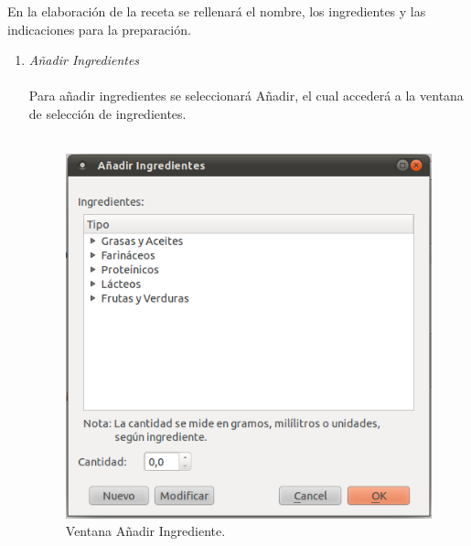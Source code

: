 \begin{enumerate}
En la elaboración de la receta se rellenará el nombre, los ingredientes y las indicaciones para la preparación. 
\begin{enumerate}
\item \textit{Añadir Ingredientes}\\\\
Para añadir ingredientes se seleccionará Añadir, el cual accederá a la ventana de selección de ingredientes.\\\\
\begin{figure}[H]
  \label{anadir_ingred}
  \begin{center}
    \includegraphics[scale=0.5]{../../Image/ingrediente-anadir.png}
  \end{center}
  \caption{Ventana Añadir Ingrediente.}
\end{figure}


\end{enumerate}
\end{enumerate}
